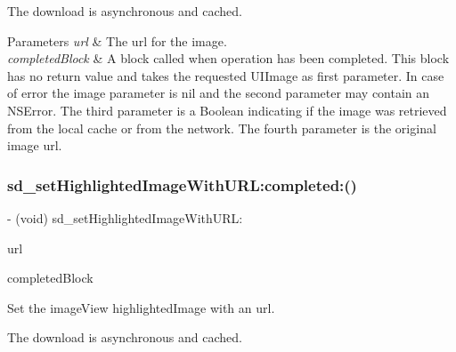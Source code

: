 The download is asynchronous and cached.


\begin{DoxyParams}{Parameters}
{\em url} & The url for the image. \\
\hline
{\em completed\+Block} & A block called when operation has been completed. This block has no return value and takes the requested U\+I\+Image as first parameter. In case of error the image parameter is nil and the second parameter may contain an N\+S\+Error. The third parameter is a Boolean indicating if the image was retrieved from the local cache or from the network. The fourth parameter is the original image url. \\
\hline
\end{DoxyParams}
\mbox{\label{category_u_i_image_view_07_highlighted_web_cache_08_a25316746c184695632dd8f4b36fd219c}} 
\subsubsection{\texorpdfstring{sd\+\_\+set\+Highlighted\+Image\+With\+U\+R\+L\+:completed\+:()}{sd\_setHighlightedImageWithURL:completed:()}\hspace{0.1cm}{\footnotesize\ttfamily [2/3]}}
{\footnotesize\ttfamily -\/ (void) sd\+\_\+set\+Highlighted\+Image\+With\+U\+R\+L\+: \begin{DoxyParamCaption}\item[{(N\+S\+U\+RL $\ast$)}]{url }\item[{completed:(S\+D\+Web\+Image\+Completion\+Block)}]{completed\+Block }\end{DoxyParamCaption}}

Set the image\+View {\ttfamily highlighted\+Image} with an {\ttfamily url}.

The download is asynchronous and cached.


